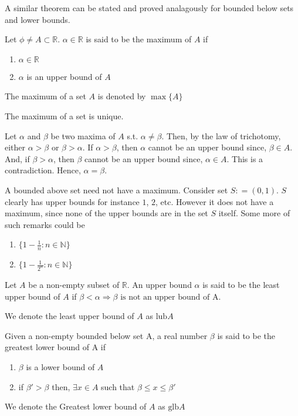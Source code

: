 \documentclass{scrartcl}
\newcommand{\rn}{\mathbb{R}}
\newcommand{\nn}{\mathbb{N}}
\begin{document}
    A similar theorem can be stated and proved analagously for bounded below sets and lower bounds.
    \begin{definition}[Maximum]
        Let $\phi \neq A \subset \rn$. $\alpha \in \rn$ is said to be the maximum of $A$ if 
        \begin{enumerate}[label={(\roman*)}]
            \item $\alpha \in \rn$
            \item $\alpha$ is an upper bound of $A$ 
        \end{enumerate}
        The maximum of a set $A$ is denoted by $\max\{A\}$
    \end{definition}
    \begin{theorem}
        The maximum of a set is unique.
    \end{theorem}
    \begin{proof*}
        Let $\alpha$ and $\beta$ be two maxima of $A$ s.t. $\alpha \neq \beta$. Then, by the law of trichotomy,
        either $\alpha > \beta$ or $\beta > \alpha$. 
        If $\alpha > \beta$, then $\alpha$ cannot be an upper bound since, $\beta \in A$. And,
        if $\beta > \alpha$, then $\beta$ cannot be an upper bound since, $\alpha \in A$. This is a contradiction. 
        Hence, $\alpha = \beta$.
    \end{proof*}
    \begin{remark}
        A bounded above set need not have a maximum. Consider set $S : = (0,1)$. $S$ clearly has upper bounds
        for instance $1$, $2$, etc. However it does not have a maximum, since none of the upper bounds are in the set $S$ itself. Some more of such remarks could be
        \begin{enumerate}
            \item $\{ 1 - \frac{1}{n} : n \in \nn\}$
            \item $\{1 - \frac{1}{2^n} : n \in \nn \}$
        \end{enumerate}
    \end{remark}
    \begin{definition}
        Let $A$ be a non-empty subset of $\rn$. An upper bound $\alpha$ is said to be the least upper bound of $A$
        if $\beta < \alpha \Rightarrow \beta \text{ is not an upper bound of A.}$

        We denote the least upper bound of $A$ as $\text{lub}A$
    \end{definition}
    \begin{definition}
        Given a non-empty bounded below set A, a real number $\beta$ is said to be the greatest lower bound of A if 
        \begin{enumerate}[label={(\roman*)}]
            \item $\beta$ is a lower bound of $A$
            \item if $\beta' > \beta$ then, $\exists x \in A$ such that $\beta \leq x \leq \beta'$
        \end{enumerate}

        We denote the Greatest lower bound of $A$ as $\text{glb}A$
    \end{definition}
\end{document}
